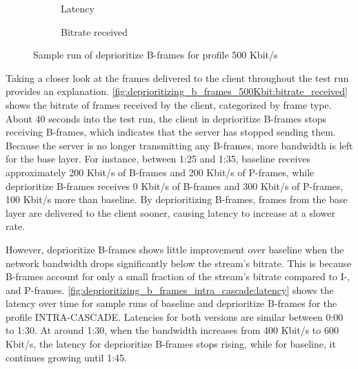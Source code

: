 \begin{figure}
    \centering
    \begin{subfigure}{\textwidth}
        \centering
        
        \caption{Latency}
        \label{fig:deprioritizing_b_frames_500Kbit:latency}
    \end{subfigure}

    \vspace{1.5em}

    \begin{subfigure}{\textwidth}
        \centering
        
        \vspace{1em}
        \caption{Bitrate received}
        \label{fig:deprioritizing_b_frames_500Kbit:bitrate_received}
    \end{subfigure}

    \vspace{1.5em}

    \caption{Sample run of deprioritize B-frames for profile 500 Kbit/s}
\end{figure}

Taking a closer look at the frames delivered to the client throughout the test run provides an explanation.
\autoref{fig:deprioritizing_b_frames_500Kbit:bitrate_received} shows the bitrate of frames received by the client, categorized by frame type. About 40 seconds into the test run, the client in deprioritize B-frames stops receiving B-frames, which indicates that the server has stopped sending them. Because the server is no longer transmitting any B-frames, more bandwidth is left for the base layer. For instance, between 1:25 and 1:35, baseline receives approximately 200 Kbit/s of B-frames and 200 Kbit/s of P-frames, while deprioritize B-frames receives 0 Kbit/s of B-frames and 300 Kbit/s of P-frames, 100 Kbit/s more than baseline. By deprioritizing B-frames, frames from the base layer are delivered to the client sooner, causing latency to increase at a slower rate.

However, deprioritize B-frames shows little improvement over baseline when the network bandwidth drops significantly below the stream's bitrate. This is because B-frames account for only a small fraction of the stream's bitrate compared to I-, and P-frames. \autoref{fig:deprioritizing_b_frames_intra_cascade:latency} shows the latency over time for sample runs of baseline and deprioritize B-frames for the profile INTRA-CASCADE. Latencies for both versions are similar between 0:00 to 1:30. At around 1:30, when the bandwidth increases from 400 Kbit/s to 600 Kbit/s, the latency for deprioritize B-frames stops rising, while for baseline, it continues growing until 1:45. 

